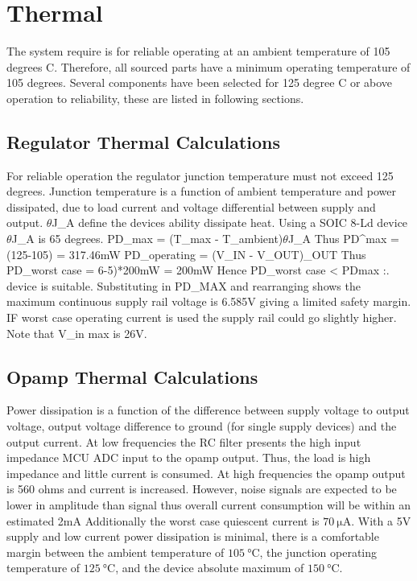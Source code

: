\section{Thermal}
The system require is for reliable operating at an ambient temperature of 105 degrees C.
Therefore, all sourced parts have a minimum operating temperature of 105 degrees.
Several components have been selected for 125 degree C or above operation to reliability, these are listed in following sections.

\subsection{Regulator Thermal Calculations}
\label{ap:regulator}
For reliable operation the regulator junction temperature must not exceed 125 degrees. Junction temperature is a function of ambient temperature and power dissipated, due to load current and voltage differential between supply and output. $\theta$J_A define the devices ability dissipate heat.
Using a SOIC 8-Ld device $\theta$J_A is 65 degrees. PD_max = (T_max - T_ambient)\divide$\theta$J_A 
Thus PD^max = (125-105) = 317.46mW
PD_operating = (V_IN - V_OUT)\timesV_OUT 
Thus PD_worst case = 6-5)*200mW = 200mW
Hence PD_worst case < PDmax :. device is suitable.
Substituting in PD_MAX and rearranging shows the maximum continuous supply rail voltage is 6.585V giving a limited safety margin.
IF worst case operating current is used the supply rail could go slightly higher.
Note that V_in max is 26V.

\subsection{Opamp Thermal Calculations}
\label{ap:amplifier}
Power dissipation is a function of the difference between supply voltage to output voltage, output voltage difference to ground (for single supply devices) and the output current. At low frequencies the RC filter presents the high input impedance MCU ADC input to the opamp output. Thus, the load is high impedance and little current is consumed. At high frequencies the opamp output is 560 ohms and current is increased. However, noise signals are expected to be lower in amplitude than signal thus overall current consumption will be within an estimated 2mA
Additionally the worst case quiescent current is $\SI{70}{\micro\ampere}$.
With a 5V supply and low current power dissipation is minimal, there is a comfortable margin between the ambient temperature of $\SI{105}{\degreeCelsius}$, the junction operating temperature of $\SI{125}{\degreeCelsius}$, and the device absolute maximum of $\SI{150}{\degreeCelsius}$.

